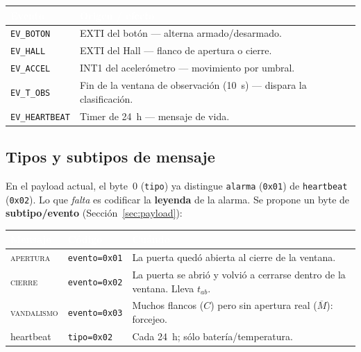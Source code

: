 \documentclass[11pt,a4paper]{article}
\begin{document}
\begin{center}
\renewcommand{\arraystretch}{1.25}
\begin{tabularx}{\linewidth}{@{}l X@{}}
\toprule
\rowcolor{Indigo0G}
\textcolor{white}{\textbf{Evento}} & \textcolor{white}{\textbf{Origen / efecto}} \\
\midrule
\texttt{EV\_BOTON}      & EXTI del botón — alterna armado/desarmado. \\
\rowcolor{Light0G}
\texttt{EV\_HALL}       & EXTI del Hall — flanco de apertura o cierre. \\
\texttt{EV\_ACCEL}      & INT1 del acelerómetro — movimiento por umbral. \\
\rowcolor{Light0G}
\texttt{EV\_T\_OBS}     & Fin de la ventana de observación (10~s) — dispara la clasificación. \\
\texttt{EV\_HEARTBEAT}  & Timer de 24~h — mensaje de vida. \\
\bottomrule
\end{tabularx}
\end{center}

\subsection{Tipos y subtipos de mensaje}

En el payload actual, el byte~0 (\texttt{tipo}) ya distingue \texttt{alarma}
(\texttt{0x01}) de \texttt{heartbeat} (\texttt{0x02}). Lo que \emph{falta} es
codificar la \textbf{leyenda} de la alarma. Se propone un byte de
\textbf{subtipo/evento} (Sección~\ref{sec:payload}):

\begin{center}
\renewcommand{\arraystretch}{1.25}
\begin{tabularx}{\linewidth}{@{}l l X@{}}
\toprule
\rowcolor{Indigo0G}
\textcolor{white}{\textbf{Mensaje}} & \textcolor{white}{\textbf{Código}} &
\textcolor{white}{\textbf{Cuándo}} \\
\midrule
\textsc{apertura}   & \texttt{evento=0x01} & La puerta quedó abierta al cierre de la ventana. \\
\rowcolor{Light0G}
\textsc{cierre}     & \texttt{evento=0x02} & La puerta se abrió y volvió a cerrarse dentro de la ventana. Lleva $t_{ab}$. \\
\textsc{vandalismo} & \texttt{evento=0x03} & Muchos flancos ($C$) pero sin apertura real ($\overline{M}$): forcejeo. \\
\rowcolor{Light0G}
heartbeat           & \texttt{tipo=0x02}   & Cada 24~h; sólo batería/temperatura. \\
\bottomrule
\end{tabularx}
\end{center}
\end{document}
